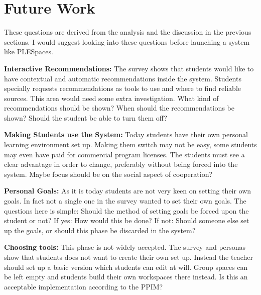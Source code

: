 \section {Future Work}
These questions are derived from the analysis and the discussion in the previous sections. I would suggest looking into these questions before launching a system like PLESpaces.

\textbf {Interactive Recommendations:} The survey shows that students would like to have contextual  and automatic recommendations inside the system. Students specially requests recommendations as tools to use and where to find reliable sources. This area would need some extra investigation. What kind of recommendations should be shown? When should the recommendations be shown? Should the student be able to turn them off?

\textbf {Making Students use the System:} Today students have their own personal learning environment set up. Making them switch may not be easy, some students may even have paid for commercial program licenses. The students must see a clear advantage in order to change, preferably without being forced into the system. Maybe focus should be on the social aspect of cooperation?

\textbf {Personal Goals:} As it is today students are not very keen on setting their own goals. In fact not a single one in the survey wanted to set their own goals. The questions here is simple: Should the method of setting goals be forced upon the student or not? If yes: How would this be done? If not: Should someone else set up the goals, or should this phase be discarded in the system?

\textbf {Choosing tools:} This phase is not widely accepted. The survey and personas show that students does not want to create their own set up. Instead the teacher should set up a basic version which students can edit at will. Group spaces can be left empty and students build their own workspaces there instead. Is this an acceptable implementation according to the PPIM?
